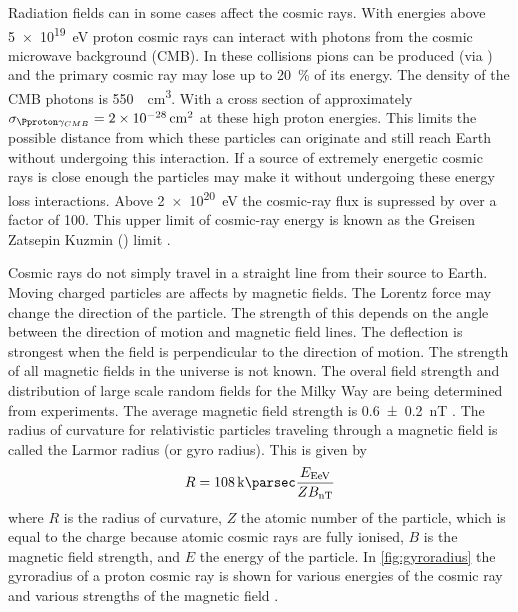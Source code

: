 Radiation fields can in some cases affect the cosmic rays. With energies above \SI{5e19}{\eV} proton cosmic rays can interact with photons from the cosmic microwave background (CMB). In these collisions pions can be produced (via \PDelta) and the primary cosmic ray may lose up to \SI{20}{\percent} of its energy. The density of the CMB photons is \SI{550}{\per\centi\meter\cubed}. With a cross section of approximately $\sigma_{\Pproton \gamma_{CMB}} = \SI{2e-28}{\centi\meter\squared}$ at these high proton energies. This limits the possible distance from which these particles can originate and still reach Earth without undergoing this interaction. If a source of extremely energetic cosmic rays is close enough the particles may make it without undergoing these energy loss interactions. Above \SI{2e20}{\eV} the cosmic-ray flux is supressed by over a factor of 100. This upper limit of cosmic-ray energy is known as the Greisen Zatsepin Kuzmin (\gzk) limit \cite{zatsepin1966gzk,greisen1966gzk}.

Cosmic rays do not simply travel in a straight line from their source to Earth. Moving charged particles are affects by magnetic fields. The Lorentz force may change the direction of the particle. The strength of this depends on the angle between the direction of motion and magnetic field lines. The deflection is strongest when the field is perpendicular to the direction of motion. The strength of all magnetic fields in the universe is not known. The overal field strength and distribution of large scale random fields for the Milky Way are being determined from experiments. The average magnetic field strength is \SI{0.6 \pm .2}{\nano\tesla} \cite{jansson2010magnetic}. The radius of curvature for relativistic particles traveling through a magnetic field is called the Larmor radius (or gyro radius). This is given by
%
\begin{equation}
    R = \SI{108}{\kilo\parsec}
        \frac{E_{\si{\exa\eV}}}{Z B_{\si{\nano\tesla}}}
\end{equation}
%
where $R$ is the radius of curvature, $Z$ the atomic number of the particle, which is equal to the charge because atomic cosmic rays are fully ionised, $B$ is the magnetic field strength, and $E$ the energy of the particle. In \cref{fig:gyroradius} the gyroradius of a proton cosmic ray is shown for various energies of the cosmic ray and various strengths of the magnetic field \cite{grigat2011anisotropy}.

